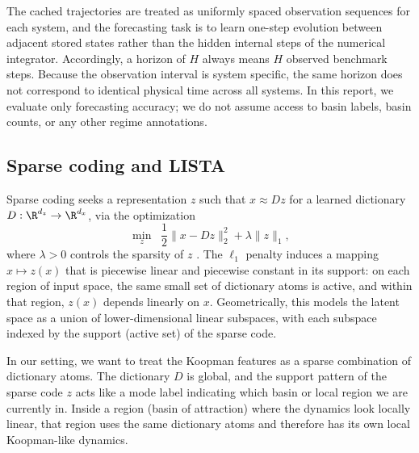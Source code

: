 The cached trajectories are treated as uniformly spaced observation sequences for each system, and the forecasting task is to learn one-step evolution between adjacent stored states rather than the hidden internal steps of the numerical integrator. Accordingly, a horizon of $H$ always means $H$ observed benchmark steps. Because the observation interval is system specific, the same horizon does not correspond to identical physical time across all systems. In this report, we evaluate only forecasting accuracy; we do not assume access to basin labels, basin counts, or any other regime annotations.

\subsection{Sparse coding and LISTA}
\label{sec:background-sparse}

Sparse coding seeks a representation $z$ such that $x \approx Dz$ for a learned dictionary $D : \R^{d_z} \to \R^{d_x}$, via the optimization
\begin{equation}
\min_z \;\; \frac{1}{2} \|x - D z\|_2^2 + \lambda \|z\|_1,
\end{equation}
where $\lambda > 0$ controls the sparsity of $z$ \citep{olshausen_emergence_1996, chen_atomic_1998, donoho_optimally_2003}.
The $\ell_1$ penalty induces a mapping $x \mapsto z(x)$ that is piecewise linear and piecewise constant in its support: on each region of input space, the same small set of dictionary atoms is active, and within that region, $z(x)$ depends linearly on $x$.
Geometrically, this models the latent space as a union of lower-dimensional linear subspaces, with each subspace indexed by the support (active set) of the sparse code.


In our setting, we want to treat the Koopman features as a sparse combination of dictionary atoms.
The dictionary $D$ is global, and the support pattern of the sparse code $z$ acts like a mode label indicating which basin or local region we are currently in.
Inside a region (basin of attraction) where the dynamics look locally linear, that region uses the same dictionary atoms and therefore has its own local Koopman-like dynamics.


